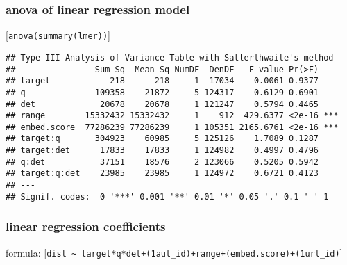 \documentclass[
  12pt,
  oneside]{book}
\begin{document}
\subsubsection{anova of linear regression model}\label{anova-of-linear-regression-model-4}

{[}\texttt{anova(summary(lmer))}{]}

\begin{verbatim}
## Type III Analysis of Variance Table with Satterthwaite's method
##                Sum Sq  Mean Sq NumDF  DenDF   F value Pr(>F)    
## target            218      218     1  17034    0.0061 0.9377    
## q              109358    21872     5 124317    0.6129 0.6901    
## det             20678    20678     1 121247    0.5794 0.4465    
## range        15332432 15332432     1    912  429.6377 <2e-16 ***
## embed.score  77286239 77286239     1 105351 2165.6761 <2e-16 ***
## target:q       304923    60985     5 125126    1.7089 0.1287    
## target:det      17833    17833     1 124982    0.4997 0.4796    
## q:det           37151    18576     2 123066    0.5205 0.5942    
## target:q:det    23985    23985     1 124972    0.6721 0.4123    
## ---
## Signif. codes:  0 '***' 0.001 '**' 0.01 '*' 0.05 '.' 0.1 ' ' 1
\end{verbatim}

\subsubsection{linear regression coefficients}\label{linear-regression-coefficients-4}

formula: {[}\texttt{dist\ \textasciitilde{}\ target*q*det+(1\textbar{}aut\_id)+range+(embed.score)+(1\textbar{}url\_id)}{]}
\end{document}
